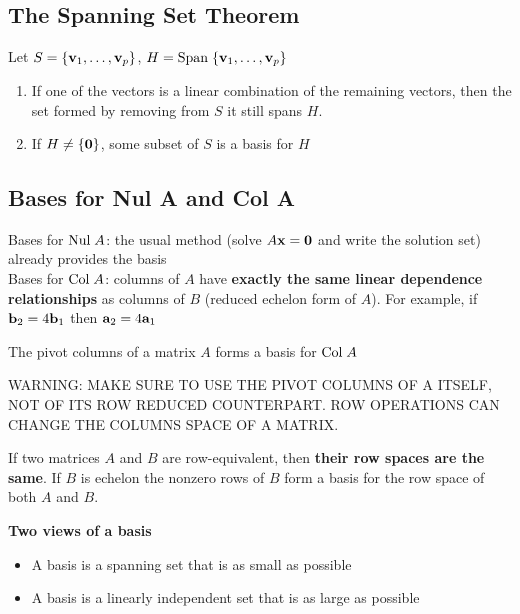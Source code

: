 \documentclass{report}
\begin{document}
\subsection{The Spanning Set Theorem}

\begin{theorem}
    Let $S = \{\mathbf{v}_1, \ldots, \mathbf{v}_p\}$, $H = \mathrm{Span}\; \{\mathbf{v}_1, \ldots, \mathbf{v}_p\}$
    \begin{enumerate}[label=\alph*.]
        \item If one of the vectors is a linear combination of the remaining vectors,
        then the set formed by removing from $S$ it still spans $H$.
        \item If $H \ne \{\mathbf{0}\}$, some subset of $S$ is a basis for $H$
    \end{enumerate}
\end{theorem}

\subsection{Bases for Nul A and Col A}

Bases for $\mathrm{Nul}\; A$: the usual method (solve $A\mathbf{x} = \mathbf{0}$ and write the solution set) 
already provides the basis\\

Bases for $\mathrm{Col}\; A$: columns of $A$ have \textbf{exactly the same linear 
dependence relationships} as columns of $B$ (reduced echelon form of $A$).
For example, if $\mathbf{b}_2 = 4 \mathbf{b}_1$ then $\mathbf{a}_2 = 4 \mathbf{a}_1$

\begin{theorem}
    The pivot columns of a matrix $A$ forms a basis for $\mathrm{Col}\; A$
\end{theorem}

WARNING: MAKE SURE TO USE THE PIVOT COLUMNS OF A ITSELF, NOT OF ITS ROW 
REDUCED COUNTERPART. ROW OPERATIONS CAN CHANGE THE COLUMNS SPACE OF A MATRIX.
\\

\begin{theorem}
    If two matrices $A$ and $B$ are row-equivalent, then \textbf{their row spaces are the same}. 
    If $B$ is echelon the nonzero rows of $B$ form a basis for the row space of both $A$ and $B$.
\end{theorem}

\textbf{Two views of a basis}
\begin{itemize}
    \item A basis is a spanning set that is as small as possible
    \item A basis is a linearly independent set that is as large as possible
\end{itemize}
\end{document}

